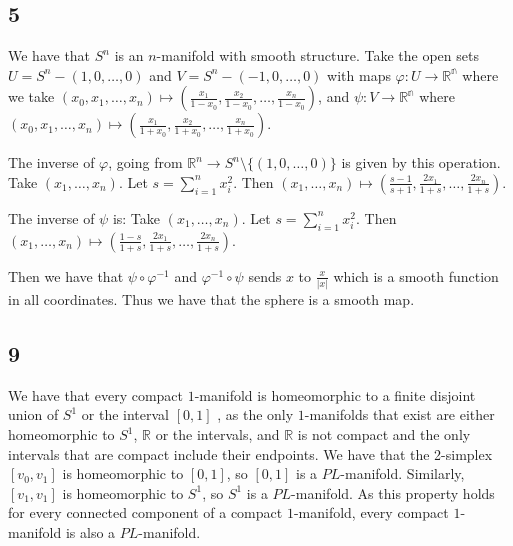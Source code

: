 \documentclass{article}
\theoremstyle{definition}
\numberwithin{theorem}{section}
\numberwithin{equation}{section}
\begin{document}
\subsection{5}
We have that $S^n$ is an $n$-manifold with smooth structure. Take the open sets $U = S^n - (1, 0, \ldots, 0)$ and $V = S^n - (-1, 0, \ldots, 0)$ with maps $\varphi : U \rightarrow \mathbb{R^n}$ where we take $(x_0, x_1, \ldots, x_n) \mapsto (\frac{x_1}{1- x_0}, \frac{x_2}{1- x_0}, \ldots, \frac{x_n}{1- x_0} )$, and $\psi : V \rightarrow \mathbb{R^n}$ where $(x_0, x_1, \ldots, x_n) \mapsto (\frac{x_1}{1+x_0}, \frac{x_2}{1+ x_0}, \ldots, \frac{x_n}{1+x_0} )$. 

The inverse of $\varphi$, going from $\mathbb{R}^n \rightarrow S^n\setminus \{(1, 0, \ldots, 0)\}$ is given by this operation. Take $(x_1, \ldots, x_n)$. Let $s = \sum_{i = 1}^n x_i^2$. Then $(x_1, \ldots, x_n) \mapsto (\frac{s - 1}{s + 1}, \frac{2x_1}{1 + s}, \ldots, \frac{2x_n}{1 + s})$. 

The inverse of $\psi$ is: Take $(x_1, \ldots, x_n)$. Let $s = \sum_{i = 1}^n x_i^2$. Then $(x_1, \ldots, x_n) \mapsto (\frac{1 - s}{1 + s}, \frac{2x_1}{1 + s}, \ldots, \frac{2x_n}{1 + s})$. 

Then we have that $\psi \circ \varphi^{-1}$ and $\varphi^{-1} \circ \psi$ sends $x$ to $ \frac{x}{|x|}$ which is a smooth function in all coordinates. Thus we have that the sphere is a smooth map. 
\subsection{9}
We have that every compact $1$-manifold is homeomorphic to a finite disjoint union of $S^1$ or the interval $[0,1]$ , as the only $1$-manifolds that exist are either homeomorphic to $S^1$, $\mathbb{R}$ or the intervals, and $\mathbb{R}$ is not compact and the only intervals that are compact include their endpoints. We have that the 2-simplex $[v_0, v_1]$ is homeomorphic to $[0,1]$, so $[0,1]$ is a $PL$-manifold. Similarly, $[v_1, v_1]$ is homeomorphic to $S^1$, so $S^1$ is a $PL$-manifold. As this property holds for every connected component of a compact $1$-manifold, every compact $1$-manifold is also a $PL$-manifold. 
\end{document}
